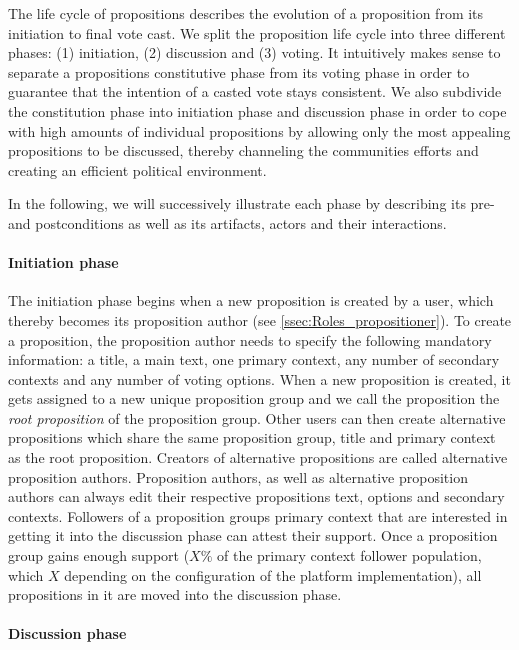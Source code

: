 The life cycle of propositions describes the evolution of a proposition from its initiation to final vote cast.
We split the proposition life cycle into three different phases: (1) initiation, (2) discussion and (3) voting.
It intuitively makes sense to separate a propositions constitutive phase from its voting phase in order to guarantee that the intention of a casted vote stays consistent.
We also subdivide the constitution phase into initiation phase and discussion phase in order to cope with high amounts of individual propositions by allowing only the most appealing propositions to be discussed, thereby channeling the communities efforts and creating an efficient political environment.

In the following, we will successively illustrate each phase by describing its pre- and postconditions as well as its artifacts, actors and their interactions.

\paragraph{Initiation phase}
\label{ssec:Lifecycle_Initiation}

The initiation phase begins when a new proposition is created by a user, which thereby becomes its proposition author (see \ref{ssec:Roles_propositioner}).
To create a proposition, the proposition author needs to specify the following mandatory information: a title, a main text, one primary context, any number of secondary contexts and any number of voting options.
When a new proposition is created, it gets assigned to a new unique proposition group and we call the proposition the \emph{root proposition} of the proposition group.
Other users can then create alternative propositions which share the same proposition group, title and primary context as the root proposition.
Creators of alternative propositions are called alternative proposition authors.
Proposition authors, as well as alternative proposition authors can always edit their respective propositions text, options and secondary contexts.
Followers of a proposition groups primary context that are interested in getting it into the discussion phase can attest their support.
Once a proposition group gains enough support ($X\%$ of the primary context follower population, which $X$ depending on the configuration of the platform implementation), all propositions in it are moved into the discussion phase.


\paragraph{Discussion phase}
\label{ssec:Lifecycle_Discussion}

